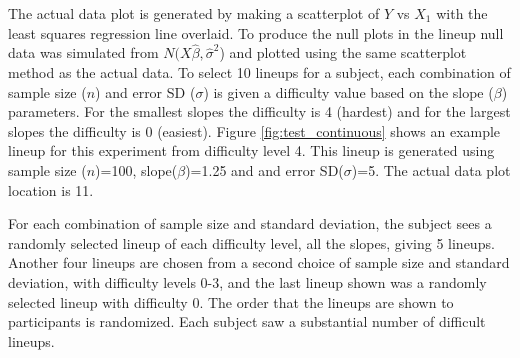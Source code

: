 \documentclass[12pt]{article}
\newcommand{\green}[1]{{\color{green} #1}} %
\newcommand{\hh}[1]{{\color{orange} #1}} %
\begin{document}
The actual data plot is generated by making a scatterplot of $Y$ vs $X_1$ with the least squares regression line overlaid. To produce the null plots in the lineup null data was simulated from $N(X \hat{\beta}, {\hat{\sigma}}^2$) and plotted using the same scatterplot method as the actual data. 
To select 10 lineups for a subject, each combination of sample size ($n$) and error SD ($\sigma$) is given a difficulty value based on the slope ($\beta$) parameters. For the smallest slopes the difficulty is 4 (hardest) and for the largest slopes the difficulty is 0 (easiest). 
Figure \ref{fig:test_continuous} shows an example lineup for this experiment from difficulty level 4.  This lineup is generated using sample size ($n$)=100, slope($\beta$)=1.25 and and error SD($\sigma$)=5. The actual data plot location is 11. 

For each combination of sample size and standard deviation, the subject sees a randomly selected lineup of each difficulty level, all the slopes, giving 5 lineups. Another four lineups are chosen from a second choice of sample size and standard deviation, with difficulty levels 0-3, and the last lineup shown was a randomly selected lineup with difficulty 0. The order that the lineups are shown to participants is randomized. Each subject saw a substantial number of difficult lineups. 


\end{document}
